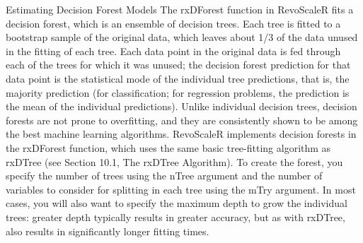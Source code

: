 Estimating Decision Forest
Models
The rxDForest function in RevoScaleR fits a decision forest, which is an ensemble of decision
trees. Each tree is fitted to a bootstrap sample of the original data, which leaves about 1/3 of
the data unused in the fitting of each tree. Each data point in the original data is fed through
each of the trees for which it was unused; the decision forest prediction for that data point is
the statistical mode of the individual tree predictions, that is, the majority prediction (for
classification; for regression problems, the prediction is the mean of the individual predictions).
Unlike individual decision trees, decision forests are not prone to overfitting, and they are
consistently shown to be among the best machine learning algorithms. RevoScaleR implements
decision forests in the rxDForest function, which uses the same basic tree-fitting algorithm as
rxDTree (see Section 10.1, The rxDTree Algorithm). To create the forest, you specify the
number of trees using the nTree argument and the number of variables to consider for splitting
in each tree using the mTry argument. In most cases, you will also want to specify the maximum
depth to grow the individual trees: greater depth typically results in greater accuracy, but as
with rxDTree, also results in significantly longer fitting times. 
